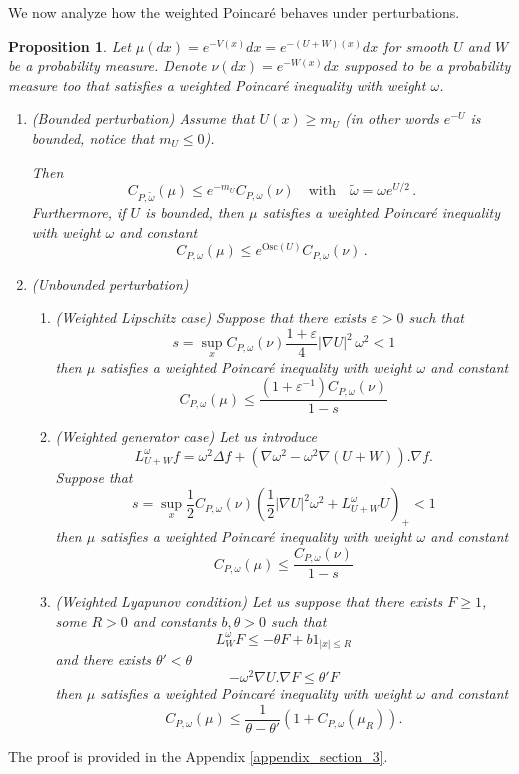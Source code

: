 \documentclass[11pt,reqno]{amsart}
\numberwithin{equation}{section}
\newtheorem{proposition}[theorem]{Proposition}
\theoremstyle{definition}
\theoremstyle{remark}
\def \Osc {\textrm{Osc}}
\begin{document}
We now analyze how the weighted Poincar\'e behaves under perturbations.
\begin{proposition}\label{propWeightPperturb}
 Let $\mu(dx)= e^{-V(x)}dx=e^{-(U+W)(x)} dx$ for smooth $U$ and $W$ be a probability measure. Denote $\nu(dx)=e^{-W(x)}dx$ supposed to be a probability measure too that satisfies a weighted Poincar\'e inequality with weight $\omega$. 
\begin{enumerate}
     \item (Bounded perturbation) Assume that $U(x) \geq m_U$ (in other words $e^{-U}$ is bounded, notice that $m_U\leq 0$).

Then $$C_{P, \tilde\omega}(\mu)\leq e^{-m_U} C_{P, \omega}(\nu)\quad\textrm{with} \quad\tilde\omega=\omega e^{U/2} \, .$$
Furthermore, if $U$ is bounded, then $\mu$ satisfies a weighted Poincar\'e inequality with weight $\omega$ and constant $$C_{P, \omega}(\mu)\leq e^{\Osc(U)} C_{P, \omega}(\nu)\, .$$
\item (Unbounded perturbation)
\begin{enumerate}
    \item (Weighted Lipschitz case) Suppose that there exists $\varepsilon>0$ such that
    $$s=\sup_x C_{P, \omega}(\nu)\frac{1+\varepsilon}{4}|\nabla U|^2 \, \omega^2<1$$
    then $\mu$ satisfies a weighted Poincar\'e inequality with weight $\omega$ and constant
    $$C_{P,\omega}(\mu)\le \frac{(1+\varepsilon^{-1})C_{P,\omega}(\nu)}{1-s}$$
    \item (Weighted generator case) Let us introduce
    $$L_{U+W}^{\omega}f = \omega^2 \Delta f +(\nabla \omega^2-\omega^2 \nabla (U+ W)) .\nabla f .$$
    Suppose that
    $$s=\sup_x \frac{1}{2}C_{P,\omega}(\nu)\left(\frac12|\nabla U|^2\omega^2+L_{U+W}^{\omega}U\right)_+<1$$
    then $\mu$ satisfies a weighted Poincar\'e inequality with weight $\omega$ and constant
    $$C_{P,\omega}(\mu)\le \frac{C_{P,\omega}(\nu)}{1-s}$$
    \item (Weighted Lyapunov condition) Let us suppose that there exists $F\ge 1$, some $R>0$ and constants $b,\theta>0$ such that
    \begin{equation}\label{lyapw}
    L_W^\omega F\le -\theta F+b1_{|x|\le R}
    \end{equation}
    and there exists $\theta'<\theta$
    $$-\omega^2\nabla U.\nabla F\le \theta' F$$
    then $\mu$ satisfies a weighted Poincar\'e inequality with weight $\omega$ and constant
    $$C_{P,\omega}(\mu)\le \frac{1}{\theta-\theta'}(1+C_{P,\omega}(\mu_R)).$$
\end{enumerate}
\end{enumerate}
\end{proposition}
The proof is provided in the Appendix \ref{appendix_section_3}.
\end{document}
